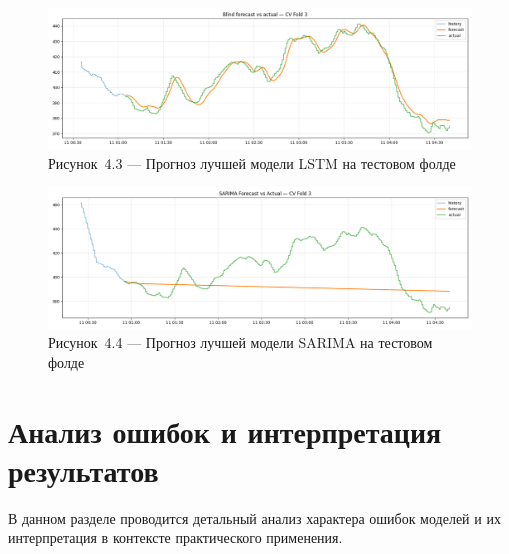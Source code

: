 \begin{figure}[H]
	\centering
	\includegraphics[width=\textwidth]{figures/chapter4/lstm_forecast.png}
	\caption*{Рисунок~4.3 — Прогноз лучшей модели LSTM на тестовом фолде}
	\label{fig:lstm_forecast}
\end{figure}

\begin{figure}[H]
	\centering
	\includegraphics[width=\textwidth]{figures/chapter4/sarima_forecast.png}
	\caption*{Рисунок~4.4 — Прогноз лучшей модели SARIMA на тестовом фолде}
	\label{fig:sarima_forecast}
\end{figure}

\section{Анализ ошибок и интерпретация результатов}
\label{sec:error_analysis}

\hspace*{1.25cm}В данном разделе проводится детальный анализ характера ошибок моделей и их интерпретация в контексте практического применения.

